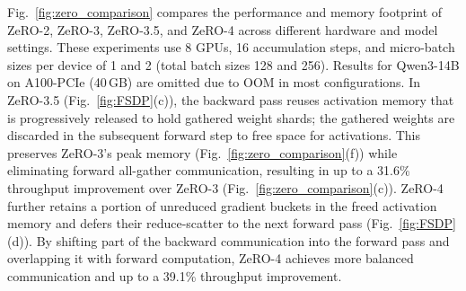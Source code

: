 \documentclass[letterpaper,twocolumn,10pt]{article}
\begin{document}
Fig.~\ref{fig:zero_comparison} compares the performance and memory footprint of ZeRO-2, ZeRO-3, ZeRO-3.5, and ZeRO-4 across different hardware and model settings. These experiments use 8 GPUs, 16 accumulation steps, and micro-batch sizes per device of 1 and 2 (total batch sizes 128 and 256). Results for Qwen3-14B on A100-PCIe (40\,GB) are omitted due to OOM in most configurations. In ZeRO-3.5 (Fig.~\ref{fig:FSDP}(c)), the backward pass reuses activation memory that is progressively released to hold gathered weight shards; the gathered weights are discarded in the subsequent forward step to free space for activations. This preserves ZeRO-3's peak memory (Fig.~\ref{fig:zero_comparison}(f)) while eliminating forward all-gather communication, resulting in up to a 31.6\% throughput improvement over ZeRO-3 (Fig.~\ref{fig:zero_comparison}(c)). ZeRO-4 further retains a portion of unreduced gradient buckets in the freed activation memory and defers their reduce-scatter to the next forward pass (Fig.~\ref{fig:FSDP}(d)). By shifting part of the backward communication into the forward pass and overlapping it with forward computation, ZeRO-4 achieves more balanced communication and up to a 39.1\% throughput improvement.
\end{document}
